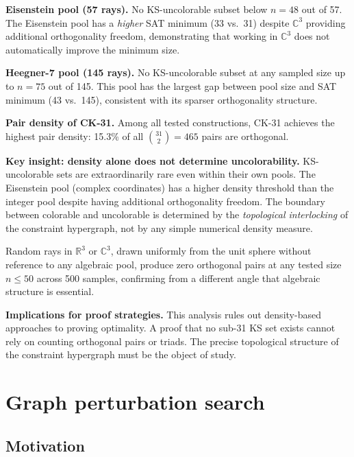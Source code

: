 \documentclass[twocolumn,pra,superscriptaddress,nofootinbib]{revtex4-2}
\newcommand{\R}{\mathbb{R}}
\newcommand{\C}{\mathbb{C}}
\begin{document}
\textbf{Eisenstein pool (57 rays).} No KS-uncolorable subset below $n = 48$ out of 57. The Eisenstein pool has a \emph{higher} SAT minimum (33 vs.\ 31) despite $\C^3$ providing additional orthogonality freedom, demonstrating that working in $\C^3$ does not automatically improve the minimum size.

\textbf{Heegner-7 pool (145 rays).} No KS-uncolorable subset at any sampled size up to $n = 75$ out of 145. This pool has the largest gap between pool size and SAT minimum (43 vs.\ 145), consistent with its sparser orthogonality structure.

\textbf{Pair density of CK-31.} Among all tested constructions, CK-31 achieves the highest pair density: 15.3\% of all $\binom{31}{2} = 465$ pairs are orthogonal.

\textbf{Key insight: density alone does not determine uncolorability.} KS-uncolorable sets are extraordinarily rare even within their own pools. The Eisenstein pool (complex coordinates) has a higher density threshold than the integer pool despite having additional orthogonality freedom. The boundary between colorable and uncolorable is determined by the \emph{topological interlocking} of the constraint hypergraph, not by any simple numerical density measure.

Random rays in $\R^3$ or $\C^3$, drawn uniformly from the unit sphere without reference to any algebraic pool, produce zero orthogonal pairs at any tested size $n \leq 50$ across 500 samples, confirming from a different angle that algebraic structure is essential.

\textbf{Implications for proof strategies.} This analysis rules out density-based approaches to proving optimality. A proof that no sub-31 KS set exists cannot rely on counting orthogonal pairs or triads. The precise topological structure of the constraint hypergraph must be the object of study.

\section{Graph perturbation search}
\label{sec:perturbation}

\subsection{Motivation}
\end{document}
